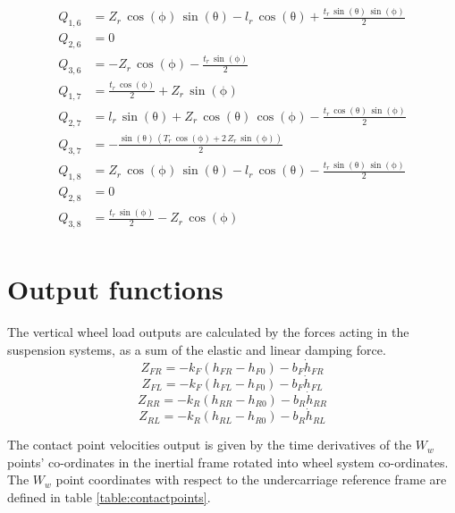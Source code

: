 \begin{align*}
Q_{1,6}&=Z_{r}\,\cos\left(\mathrm{\phi}\right)\,\sin\left(\mathrm{\theta}\right)-l_{r}\,\cos\left(\mathrm{\theta}\right)+\frac{t_{r}\,\sin\left(\mathrm{\theta}\right)\,\sin\left(\mathrm{\phi}\right)}{2}\\
Q_{2,6}&=0\\
Q_{3,6}&=-Z_{r}\,\cos\left(\mathrm{\phi}\right)-\frac{t_{r}\,\sin\left(\mathrm{\phi}\right)}{2}\\
Q_{1,7}&=\frac{t_{r}\,\cos\left(\mathrm{\phi}\right)}{2}+Z_{r}\,\sin\left(\mathrm{\phi}\right)\\
Q_{2,7}&=l_{r}\,\sin\left(\mathrm{\theta}\right)+Z_{r}\,\cos\left(\mathrm{\theta}\right)\,\cos\left(\mathrm{\phi}\right)-\frac{t_{r}\,\cos\left(\mathrm{\theta}\right)\,\sin\left(\mathrm{\phi}\right)}{2}\\
Q_{3,7}&=-\frac{\sin\left(\mathrm{\theta}\right)\,\left(T_{r}\,\cos\left(\mathrm{\phi}\right)+2\,Z_{r}\,\sin\left(\mathrm{\phi}\right)\right)}{2}\\
Q_{1,8}&=Z_{r}\,\cos\left(\mathrm{\phi}\right)\,\sin\left(\mathrm{\theta}\right)-l_{r}\,\cos\left(\mathrm{\theta}\right)-\frac{t_{r}\,\sin\left(\mathrm{\theta}\right)\,\sin\left(\mathrm{\phi}\right)}{2}\\
Q_{2,8}&=0\\
Q_{3,8}&=\frac{t_{r}\,\sin\left(\mathrm{\phi}\right)}{2}-Z_{r}\,\cos\left(\mathrm{\phi}\right)\\
\end{align*}


\section{Output functions}
\label{sec:6dofout}
The vertical wheel load outputs are calculated by the forces acting in the suspension systems, as a sum of the elastic and linear damping force.
$$Z_{FR} = - k_F (h_{FR} - h_{F0}) - b_F \dot h_{FR} $$
$$Z_{FL} = - k_F (h_{FL} - h_{F0}) - b_F \dot h_{FL} $$
$$Z_{RR} = - k_R (h_{RR} - h_{R0}) - b_R \dot h_{RR} $$
$$Z_{RL} = - k_R (h_{RL} - h_{R0}) - b_R \dot h_{RL} $$

The contact point velocities output is given by the time derivatives of the $W_w$ points' co-ordinates in the inertial frame rotated into wheel system co-ordinates. The $W_w$ point coordinates with respect to the undercarriage reference frame are defined in table \ref{table:contactpoints}.

